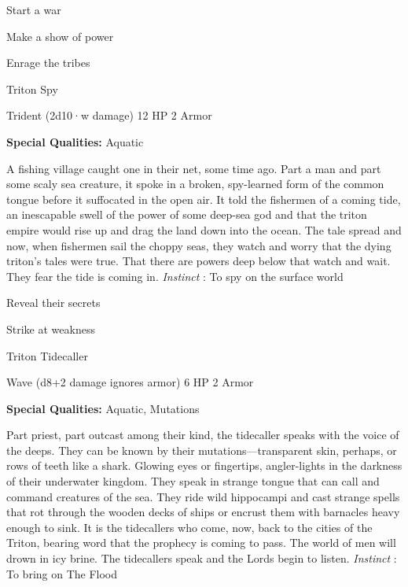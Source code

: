 \startitemize[1,packed]

\item Start a war

 
\item Make a show of power

 
\item Enrage the tribes


\stopitemize
 
\startMonsterName
Triton Spy	 
\stopMonsterName
 

Trident (2d10·w damage)	12 HP	2 Armor

 


 
\startMonsterQualities
{\bf Special Qualities:}  Aquatic
\stopMonsterQualities
 
\startMonsterDescription
A fishing village caught one in their net, some time ago. Part a man and part some scaly sea creature, it spoke in a broken, spy-learned form of the common tongue before it suffocated in the open air. It told the fishermen of a coming tide, an inescapable swell of the power of some deep-sea god and that the triton empire would rise up and drag the land down into the ocean. The tale spread and now, when fishermen sail the choppy seas, they watch and worry that the dying triton’s tales were true. That there are powers deep below that watch and wait. They fear the tide is coming in. {\em Instinct} : To spy on the surface world
\stopMonsterDescription
 
\startitemize[1,packed]

\item Reveal their secrets

 
\item Strike at weakness


\stopitemize
 
\startMonsterName
Triton Tidecaller	 
\stopMonsterName
 

Wave (d8+2 damage ignores armor)	6 HP	2 Armor

 


 
\startMonsterQualities
{\bf Special Qualities:}  Aquatic, Mutations
\stopMonsterQualities
 
\startMonsterDescription
Part priest, part outcast among their kind, the tidecaller speaks with the voice of the deeps. They can be known by their mutations—transparent skin, perhaps, or rows of teeth like a shark. Glowing eyes or fingertips, angler-lights in the darkness of their underwater kingdom. They speak in strange tongue that can call and command creatures of the sea. They ride wild hippocampi and cast strange spells that rot through the wooden decks of ships or encrust them with barnacles heavy enough to sink. It is the tidecallers who come, now, back to the cities of the Triton, bearing word that the prophecy is coming to pass. The world of men will drown in icy brine. The tidecallers speak and the Lords begin to listen. {\em Instinct} : To bring on The Flood
\stopMonsterDescription
 
